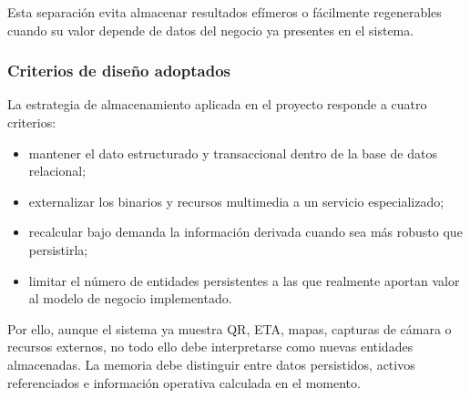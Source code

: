 Esta separación evita almacenar resultados efímeros o fácilmente regenerables cuando su valor depende de datos del negocio ya presentes en el sistema.

\subsubsection*{Criterios de diseño adoptados}

La estrategia de almacenamiento aplicada en el proyecto responde a cuatro criterios:

\begin{itemize}
    \item mantener el dato estructurado y transaccional dentro de la base de datos relacional;
    \item externalizar los binarios y recursos multimedia a un servicio especializado;
    \item recalcular bajo demanda la información derivada cuando sea más robusto que persistirla;
    \item limitar el número de entidades persistentes a las que realmente aportan valor al modelo de negocio implementado.
\end{itemize}

Por ello, aunque el sistema ya muestra QR, ETA, mapas, capturas de cámara o recursos externos, no todo ello debe interpretarse como nuevas entidades almacenadas. La memoria debe distinguir entre datos persistidos, activos referenciados e información operativa calculada en el momento.
